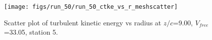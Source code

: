 \begin{figure}[H]
\centering
\texttt{[image: figs/run\_50/run\_50\_ctke\_vs\_r\_meshscatter]}
\caption{Scatter plot of turbulent kinetic energy vs radius at $z/c$=9.00, $V_{free}$=33.05, station 5.}
\label{fig:run_50_ctke_vs_r_meshscatter}
\end{figure}


